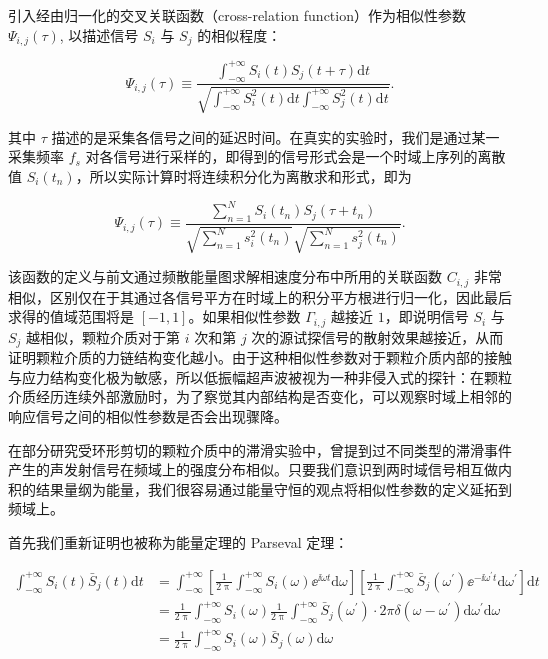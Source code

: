 引入经由归一化的交叉关联函数（cross-relation function）作为相似性参数 $\Psi_{i,j}(\tau)$, 以描述信号 $S_{i}$ 与 $S_{j}$ 的相似程度\cite{PhysRevLett.90.174302}：

\begin{equation}
  \Psi_{i,j}(\tau) \equiv \frac{\int_{-\infty}^{+\infty}S_{i}(t)S_{j}(t+\tau)\mathrm{d}t}{\sqrt{\int_{-\infty}^{+\infty}S_{i}^{2}(t)\mathrm{d}t\int_{-\infty}^{+\infty}S_{j}^{2}(t)\mathrm{d}t}}.
\end{equation}

其中 $\tau$ 描述的是采集各信号之间的延迟时间。在真实的实验时，我们是通过某一采集频率 $f_{s}$ 对各信号进行采样的，即得到的信号形式会是一个时域上序列的离散值 $S_{i}(t_{n})$，所以实际计算时将连续积分化为离散求和形式，即为

\begin{equation}
  \Psi_{i,j}(\tau)\equiv \frac{\sum_{n=1}^{N}S_{i}(t_{n})S_{j}(\tau+t_{n})}{\sqrt{\sum_{n=1}^{N}s_{i}^{2}(t_{n})}\sqrt{\sum_{n=1}^{N}s_{j}^{2}(t_{n})}}.
\end{equation}

该函数的定义与前文通过频散能量图求解相速度分布中所用的关联函数 $C_{i,j}$ 非常相似，区别仅在于其通过各信号平方在时域上的积分平方根进行归一化，因此最后求得的值域范围将是 $[-1,1]$。如果相似性参数 $\Gamma_{i,j}$ 越接近 $1$，即说明信号 $S_{i}$ 与 $S_{j}$ 越相似，颗粒介质对于第 $i$ 次和第 $j$ 次的源试探信号的散射效果越接近，从而证明颗粒介质的力链结构变化越小。由于这种相似性参数对于颗粒介质内部的接触与应力结构变化极为敏感，所以低振幅超声波被视为一种非侵入式的探针：在颗粒介质经历连续外部激励时，为了察觉其内部结构是否变化，可以观察时域上相邻的响应信号之间的相似性参数是否会出现骤降。

在部分研究受环形剪切的颗粒介质中的滞滑实验中，曾提到过不同类型的滞滑事件产生的声发射信号在频域上的强度分布相似\cite{doi:10.1073/pnas.2305134120}。只要我们意识到两时域信号相互做内积的结果量纲为能量，我们很容易通过能量守恒的观点将相似性参数的定义延拓到频域上。

首先我们重新证明也被称为能量定理的 Parseval 定理：

\begin{equation}
  \begin{aligned}
    \int_{-\infty}^{+\infty}S_{i}(t)\bar{S}_{j}(t)\mathrm{d}t &= \int_{-\infty}^{+\infty}\left[\frac{1}{2\uppi}\int_{-\infty}^{+\infty}S_{i}(\omega){\ee}^{\ii \omega t}\mathrm{d}\omega\right]\left[\frac{1}{2\uppi}\int_{-\infty}^{+\infty}\bar{S}_{j}(\omega^{\prime}){\ee}^{-\ii \omega^{\prime}t}\mathrm{d}\omega^{\prime}\right]\mathrm{d}t\\
    &= \frac{1}{2\uppi}\int_{-\infty}^{+\infty}S_{i}(\omega)\frac{1}{2\uppi}\int_{-\infty}^{+\infty}\bar{S}_{j}(\omega^{\prime})\cdot 2\pi\delta(\omega-\omega^{\prime})\mathrm{d}\omega^{\prime}\mathrm{d}\omega\\
    &= \frac{1}{2\uppi}\int_{-\infty}^{+\infty}S_{i}(\omega)\bar{S}_{j}(\omega)\mathrm{d}\omega
  \end{aligned}
\end{equation}

